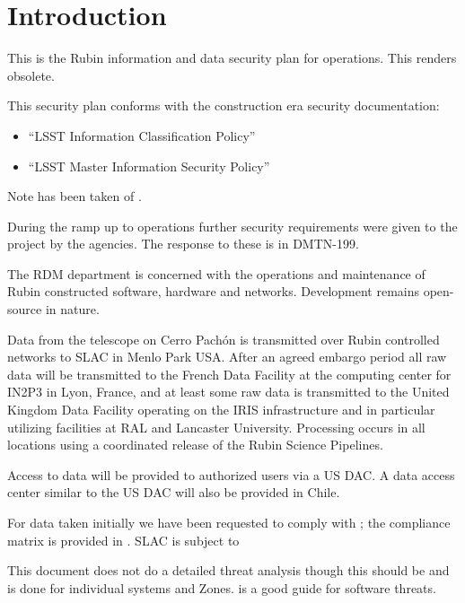 

\section{Introduction}
This is the Rubin information and data security plan for operations.
This renders  obsolete.

This security plan conforms with the construction era security documentation:
\begin{itemize}
\item “LSST Information Classification Policy” 
\item “LSST Master Information Security Policy” 
\end{itemize}

Note has been taken of \cite{TCISSG}.

During the ramp up to operations further security requirements were given to the project by the agencies.
The response to these is in \gls{DMTN}-199.

The \gls{RDM} department is concerned with the operations and maintenance  of Rubin constructed software, hardware and networks.
Development remains open-source in nature.

Data from the telescope on Cerro Pach\'{o}n is transmitted over Rubin controlled networks to \gls{SLAC} in  Menlo Park USA.
After an agreed embargo period all raw data will be transmitted to the French Data Facility at the computing center for \gls{IN2P3} in Lyon, France, and at least some raw data is transmitted to the United Kingdom Data Facility operating on the IRIS infrastructure and in particular utilizing facilities at \gls{RAL} and Lancaster University.
Processing occurs in all locations using a coordinated release of the Rubin \gls{Science Pipelines}.

Access to data will be provided to authorized  users via a US \gls{DAC}.
A data access center similar to the \gls{US} \gls{DAC} will also be provided in Chile.

For data taken initially we have been requested to comply with ; the compliance matrix is provided in  .
SLAC is subject to 


This document does not do a detailed threat analysis though this should be and is done for individual systems and Zones. \cite{TCISSG} is a good guide for software threats.








